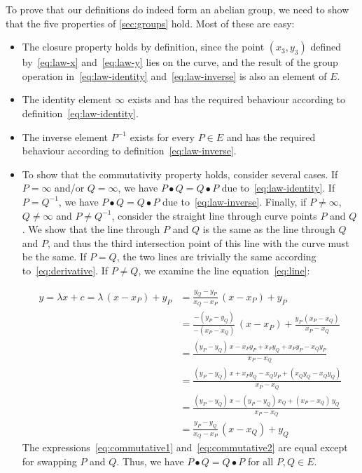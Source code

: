 \documentclass{article}
\begin{document}
To prove that our definitions do indeed form an abelian group, we need to show that the five properties of \autoref{sec:groups} hold.
Most of these are easy:
\begin{itemize}
\item The closure property holds by definition, since the point $(x_3, y_3)$ defined by~\eqref{eq:law-x} and~\eqref{eq:law-y} lies on the curve, and the result of the group operation in~\eqref{eq:law-identity} and~\eqref{eq:law-inverse} is also an element of $E$.
\item The identity element $\infty$ exists and has the required behaviour according to definition~\eqref{eq:law-identity}.
\item The inverse element $P^{-1}$ exists for every $P \in E$ and has the required behaviour according to definition~\eqref{eq:law-inverse}.
\item To show that the commutativity property holds, consider several cases.
If $P = \infty$ and/or $Q = \infty$, we have $P \bullet Q = Q \bullet P$ due to~\eqref{eq:law-identity}.
If $P = Q^{-1}$, we have $P \bullet Q = Q \bullet P$ due to~\eqref{eq:law-inverse}.
Finally, if $P \neq \infty$, $Q \neq \infty$ and $P \neq Q^{-1}$, consider the straight line through curve points $P$ and $Q$.
We show that the line through $P$ and $Q$ is the same as the line through $Q$ and $P$, and thus the third intersection point of this line with the curve must be the same.
If $P=Q$, the two lines are trivially the same according to~\eqref{eq:derivative}.
If $P \neq Q$, we examine the line equation~\eqref{eq:line}:

\begin{align}
y = \lambda x + c = \lambda\,(x - x_P) + y_P &= \frac{y_Q - y_P}{x_Q - x_P}\,(x - x_P) + y_P \label{eq:commutative1}\\[5pt]
& = \frac{-(y_P - y_Q)}{-(x_P - x_Q)}\,(x - x_P) + \frac{y_P\,(x_P - x_Q)}{x_P - x_Q} \nonumber\\[5pt]
& = \frac{(y_P - y_Q)\,x - x_P y_P + x_P y_Q + x_P y_P - x_Q y_P}{x_P - x_Q} \nonumber\\[5pt]
& = \frac{(y_P - y_Q)\,x + x_P y_Q - x_Q y_P + (x_Q y_Q - x_Q y_Q)}{x_P - x_Q} \nonumber\\[5pt]
& = \frac{(y_P - y_Q)\,x - (y_P - y_Q)\,x_Q + (x_P - x_Q)\,y_Q}{x_P - x_Q} \nonumber\\[5pt]
& = \frac{y_P - y_Q}{x_Q - x_P}\,(x - x_Q) + y_Q \label{eq:commutative2}
\end{align}
The expressions~\eqref{eq:commutative1} and~\eqref{eq:commutative2} are equal except for swapping $P$ and $Q$.
Thus, we have $P \bullet Q = Q \bullet P$ for all $P, Q \in E$.
\end{itemize}
\end{document}
